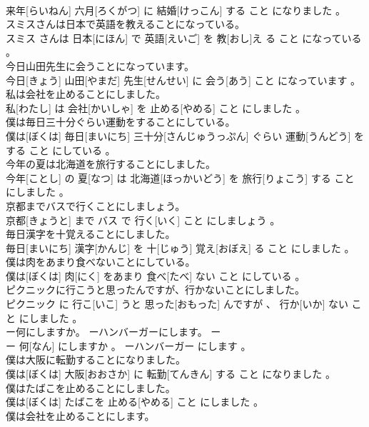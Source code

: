 \documentclass[8pt]{extreport}
\begin{document}
\begin{CJK}{UTF8}{min}
\\	来年[らいねん] 六月[ろくがつ] に 結婚[けっこん] する こと になりました 。
\\	スミスさんは日本で英語を教えることになっている。	
\\	スミス さんは 日本[にほん] で 英語[えいご] を 教[おし]え る こと になっている 。
\\	今日山田先生に会うことになっています。	
\\	今日[きょう] 山田[やまだ] 先生[せんせい] に 会う[あう] こと になっています 。
\\	私は会社を止めることにしました。	
\\	私[わたし] は 会社[かいしゃ] を 止める[やめる] こと にしました 。
\\	僕は毎日三十分ぐらい運動をすることにしている。	
\\	僕は[ぼくは] 毎日[まいにち] 三十分[さんじゅうっぷん] ぐらい 運動[うんどう] をする こと にしている 。
\\	今年の夏は北海道を旅行することにしました。	
\\	今年[ことし] の 夏[なつ] は 北海道[ほっかいどう] を 旅行[りょこう] する こと にしました 。
\\	京都までバスで行くことにしましょう。	
\\	京都[きょうと] まで バス で 行く[いく] こと にしましょう 。
\\	毎日漢字を十覚えることにしました。	
\\	毎日[まいにち] 漢字[かんじ] を 十[じゅう] 覚え[おぼえ] る こと にしました 。
\\	僕は肉をあまり食べないことにしている。	
\\	僕は[ぼくは] 肉[にく] をあまり 食べ[たべ] ない こと にしている 。
\\	ピクニックに行こうと思ったんですが、行かないことにしました。	
\\	ピクニック に 行こ[いこ] うと 思った[おもった] んですが 、 行か[いか] ない こと にしました 。
\\	ー何にしますか。 ーハンバーガーにします。	ー
\\	ー 何[なん] にしますか 。 ーハンバーガー にします 。
\\	僕は大阪に転勤することになりました。	
\\	僕は[ぼくは] 大阪[おおさか] に 転勤[てんきん] する こと になりました 。
\\	僕はたばこを止めることにしました。	
\\	僕は[ぼくは] たばこを 止める[やめる] こと にしました 。
\\	僕は会社を止めることにします。	

\end{CJK}
\end{document}
